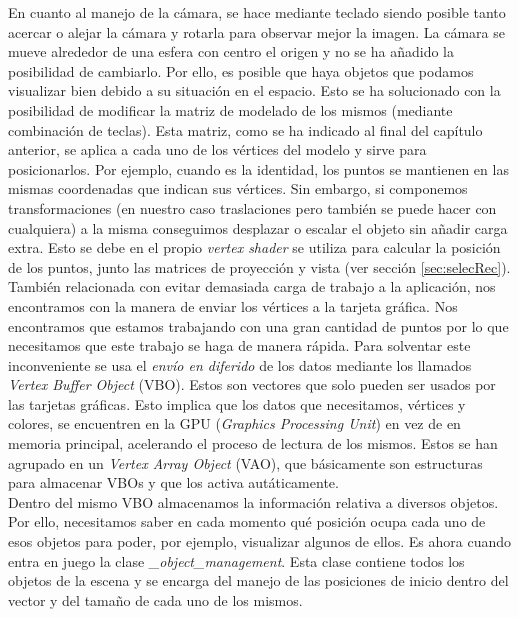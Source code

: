 En cuanto al manejo de la cámara, se hace mediante teclado siendo posible tanto acercar o alejar la cámara y rotarla para observar mejor la imagen. La cámara se mueve alrededor de una esfera con centro el origen y no se ha añadido la posibilidad de cambiarlo. Por ello, es posible que haya objetos que podamos visualizar bien debido a su situación en el espacio. Esto se ha solucionado con la posibilidad de modificar la matriz de modelado de los mismos (mediante combinación de teclas). Esta matriz, como se ha indicado al final del capítulo anterior, se aplica a cada uno de los vértices del modelo y sirve para posicionarlos. Por ejemplo, cuando es la identidad, los puntos se mantienen en las mismas coordenadas que indican sus vértices. Sin embargo, si componemos transformaciones (en nuestro caso traslaciones pero también se puede hacer con cualquiera) a la misma conseguimos desplazar o escalar el objeto sin añadir carga extra. Esto se debe en el propio \textit{vertex shader} se utiliza para calcular la posición de los puntos, junto las matrices de proyección y vista (ver sección \ref{sec:selecRec}). \\

También relacionada con evitar demasiada carga de trabajo a la aplicación, nos encontramos con la manera de enviar los vértices a la tarjeta gráfica. Nos encontramos que estamos trabajando con una gran cantidad de puntos por lo que necesitamos que este trabajo se haga de manera rápida. Para solventar este inconveniente se usa el \textit{envío en diferido} de los datos mediante los llamados \textit{Vertex Buffer Object} (VBO). Estos son vectores que solo pueden ser usados por las tarjetas gráficas. Esto implica que los datos que necesitamos, vértices y colores, se encuentren en la GPU (\textit{Graphics Processing Unit}) en vez de en memoria principal, acelerando el proceso de lectura de los mismos. Estos se han agrupado en un \textit{Vertex Array Object} (VAO), que básicamente son estructuras para almacenar VBOs y que los activa autáticamente. \\

Dentro del mismo VBO almacenamos la información relativa a diversos objetos. Por ello, necesitamos saber en cada momento qué posición ocupa cada uno de esos objetos para poder, por ejemplo, visualizar algunos de ellos. Es ahora cuando entra en juego la clase \textit{\_object\_management}. Esta clase contiene todos los objetos de la escena y se encarga del manejo de las posiciones de inicio dentro del vector y del tamaño de cada uno de los mismos. \\


